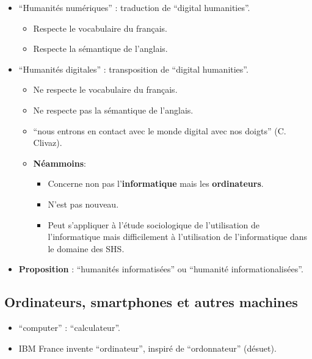 \documentclass{beamer}
\newcommand{\forme}[1]{\enquote{#1}}
\newcommand{\formeenglish}[1]{\forme{\textenglish{#1}}}
\begin{document}
\begin{slide}
	\begin{itemize}
		\item \forme{Humanités numériques} : traduction de \forme{digital humanities}.
		\begin{itemize}
			\item Respecte le vocabulaire du français.
			\item Respecte la sémantique de l'anglais.
		\end{itemize}
		
		\item \forme{Humanités digitales} : transposition de \forme{digital humanities}.
			\begin{itemize}
				\item Ne respecte le vocabulaire du français.
				\item Ne respecte pas la sémantique de l'anglais.
				\item {} \enquote{nous entrons en contact avec le monde digital avec nos doigts} (C. Clivaz). %
				\item \textbf{Néammoins}:
				\begin{itemize}
					\item Concerne non pas l'\textbf{informatique} mais les \textbf{ordinateurs}.
					\item N'est pas nouveau.
					\item Peut s'appliquer à l'étude sociologique de l'utilisation de l'informatique mais difficilement à l'utilisation de l'informatique dans le domaine des SHS.
				\end{itemize}
			\end{itemize}
		\item \textbf{Proposition} : \forme{humanités informatisées} ou \forme{humanité informationalisées}.
	\end{itemize}
\end{slide}
\subsection{Ordinateurs, smartphones et autres machines}

\begin{slide}
	\begin{itemize}
		\item \formeenglish{computer} : \forme{calculateur}.
		\item IBM France invente \forme{ordinateur}, inspiré de \forme{ordonnateur} (désuet).
	\end{itemize}
\end{slide}
\end{document}
